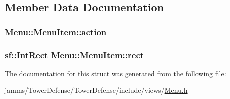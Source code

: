 \subsection{Member Data Documentation}
\hypertarget{struct_menu_1_1_menu_item_a59b62e6cbc3ecae51b46e787b56179f9}{
\subsubsection[{action}]{ Menu\+::\+Menu\+Item\+::action}}\label{struct_menu_1_1_menu_item_a59b62e6cbc3ecae51b46e787b56179f9}
\hypertarget{struct_menu_1_1_menu_item_ae1998c7b6dad5e12faa131248eb750e3}{
\subsubsection[{rect}]{\setlength{\rightskip}{0pt plus 5cm}sf\+::\+Int\+Rect Menu\+::\+Menu\+Item\+::rect}}\label{struct_menu_1_1_menu_item_ae1998c7b6dad5e12faa131248eb750e3}


The documentation for this struct was generated from the following file\+:\begin{DoxyCompactItemize}
\item 
jamms/\+Tower\+Defense/\+Tower\+Defense/include/views/\hyperlink{_menu_8h}{Menu.\+h}\end{DoxyCompactItemize}
